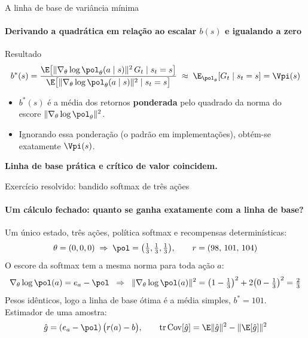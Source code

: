 \documentclass[aspectratio=169, 11pt]{beamer}
\newcommand{\ghat}{\hat{g}}
\begin{document}
\begin{frame}{A linha de base de variância mínima}
  \framesubtitle{Derivando a quadrática em relação ao escalar $b(s)$ e igualando a zero}

  \begin{teobox}{Resultado}
    \[
      b^*(s) = \frac{\E\big[\|\nabla_\theta\log\pol_\theta(a\mid s)\|^2\,G_t\mid s_t=s\big]}
                    {\E\big[\|\nabla_\theta\log\pol_\theta(a\mid s)\|^2\mid s_t=s\big]}
      \;\approx\;\E_{\pol_\theta}[G_t\mid s_t=s] = \Vpi(s)
    \]
  \end{teobox}

  \begin{itemize}
    \item $b^*(s)$ é a média dos retornos \textbf{ponderada} pelo quadrado da norma do escore
          $\|\nabla_\theta\log\pol_\theta\|^2$.
    \item Ignorando essa ponderação (o padrão em implementações), obtém-se exatamente $\Vpi(s)$.
  \end{itemize}

  \begin{center}
    \textbf{Linha de base prática e crítico de valor coincidem.}
  \end{center}
\end{frame}

\begin{frame}{Exercício resolvido: bandido softmax de três ações}
  \framesubtitle{Um cálculo fechado: quanto se ganha exatamente com a linha de base?}

  Um único estado, três ações, política softmax e recompensas determinísticas:
  \[
    \theta=(0,0,0)\;\Rightarrow\;\pol = \big(\tfrac13,\tfrac13,\tfrac13\big),\qquad r = (98,\,101,\,104)
  \]
  O escore da softmax tem a mesma norma para toda ação $a$:
  \[
    \nabla_\theta\log\pol(a) = e_a - \pol\;\;\Rightarrow\;\;
    \|\nabla_\theta\log\pol(a)\|^2 = \big(1-\tfrac13\big)^2 + 2\big(0-\tfrac13\big)^2 = \tfrac23
  \]
  Pesos idênticos, logo a linha de base ótima é a média simples, $b^* = 101$. Estimador de uma amostra:
  \[
    \ghat = (e_a-\pol)\,\big(r(a)-b\big),\qquad
    \mathrm{tr}\,\mathrm{Cov}[\ghat] = \E\|\ghat\|^2 - \|\E[\ghat]\|^2
  \]
\end{frame}
\end{document}
